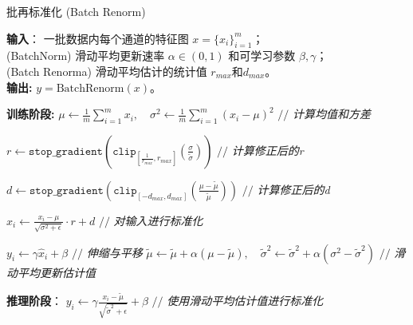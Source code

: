 \begin{algorithm}[htbp]
    \caption{批再标准化 (Batch Renorm)}
    \label{alg:batchrenorm}
    \begin{algorithmic}
        \STATE \hspace{-11pt} {\bfseries 输入}： 一批数据内每个通道的特征图 $x=\{x_{i}\}_{i=1}^{m}$；\\
        (BatchNorm) 滑动平均更新速率 $\alpha \in (0,1)$ 和可学习参数 $\beta, \gamma$； \\
        (Batch Renorma) 滑动平均估计的统计值 $r_{max}$和$d_{max}$。 \\
        \STATE \hspace{-11pt} {\bfseries 输出:} $y={\textrm{BatchRenorm}}(x)$。
    
        \STATE \hspace{-11pt} \textbf{训练阶段:}
        \STATE $\displaystyle \mu \leftarrow \frac{1}{m}\sum_{i=1}^{m}x_{i}, \quad \sigma^2 \leftarrow \frac{1}{m}\sum_{i=1}^{m}(x_i-\mu)^2$ \hfill $//$ \textit{计算均值和方差}
    
        \STATE $\displaystyle r \leftarrow {\texttt{stop\_gradient}}( {\texttt{clip}}_{ [ \frac{1}{r_{max}},r_{max} ] } (\frac{\sigma}{\tilde{\sigma} }) )$
        \hfill $//$ \textit{计算修正后的r}
        
        \STATE $\displaystyle d \leftarrow {\texttt{stop\_gradient}}( {\texttt{clip}}_{[-d_{max},d_{max}]}(\frac{\mu - \tilde{\mu}}{ \tilde{\mu} }) )$
        \hfill $//$ \textit{计算修正后的d}

        \STATE $\displaystyle \widehat{x}_{i} \leftarrow 
        \frac{x_{i}-\mu}{\sqrt{\sigma^2+\epsilon}} \cdot r + d$
        \hfill $//$ \textit{对输入进行标准化}
  
        \STATE $y_{i} \leftarrow \gamma \widehat{x}_{i} +\beta$
        \hfill $//$ \textit{伸缩与平移}
        \STATE $\tilde{\mu} \leftarrow \tilde{\mu} + \alpha (\mu-\tilde{\mu}), \quad \tilde{\sigma}^2 \leftarrow \tilde{\sigma}^2 + \alpha (\sigma^2-\tilde{\sigma}^2)$ 
        \hfill $//$ \textit{滑动平均更新估计值}
        
        \STATE \hspace{-11pt} {\bfseries 推理阶段}：
        \STATE $\displaystyle y_{i} \leftarrow \gamma \frac{x_{i}-\tilde{\mu}}{\sqrt{\tilde{\sigma}^2 + \epsilon}} + \beta$ \hfill $//$ \textit{使用滑动平均估计值进行标准化}
    \end{algorithmic}
  \end{algorithm}

